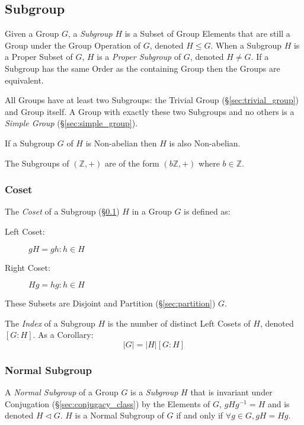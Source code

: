 \subsection{Subgroup}\label{sec:subgroup}

Given a Group $G$, a \emph{Subgroup} $H$ is a Subset of Group Elements
that are still a Group under the Group Operation of $G$, denoted $H
\leq G$. When a Subgroup $H$ is a Proper Subset of $G$, $H$ is a
\emph{Proper Subgroup} of $G$, denoted $H \neq G$. If a Subgroup has
the same Order as the containing Group then the Groups are equivalent.

All Groups have at least two Subgroups: the Trivial Group
(\S\ref{sec:trivial_group}) and Group itself. A Group with exactly
these two Subgroups and no others is a \emph{Simple Group}
(\S\ref{sec:simple_group}).

If a Subgroup $G$ of $H$ is Non-abelian then $H$ is also Non-abelian.

The Subgroups of $(\mathbb{Z},+)$ are of the form $(b\mathbb{Z},+)$
where $b \in \mathbb{Z}$.



\subsubsection{Coset}\label{sec:coset}

The \emph{Coset} of a Subgroup (\S\ref{sec:subgroup}) $H$ in a Group
$G$ is defined as:
\begin{description}
\item[Left Coset:] $gH = {gh : h \in H}$
\item[Right Coset:] $Hg = {hg : h \in H}$
\end{description}
These Subsets are Disjoint and Partition (\S\ref{sec:partition}) $G$.

The \emph{Index} of a Subgroup $H$ is the number of distinct Left
Cosets of $H$, denoted $[G:H]$. As a Corollary:
\[
    |G| = |H|[G:H]
\]



\subsubsection{Normal Subgroup}\label{sec:normal_subgroup}

A \emph{Normal Subgroup} of a Group $G$ is a \emph{Subgroup} $H$ that
is invariant under Conjugation (\S\ref{sec:conjugacy_class}) by the
Elements of $G$, $gHg^{-1} = H$ and is denoted $H \triangleleft G$.
$H$ is a Normal Subgroup of $G$ if and only if $\forall g \in G, gH =
Hg$.

